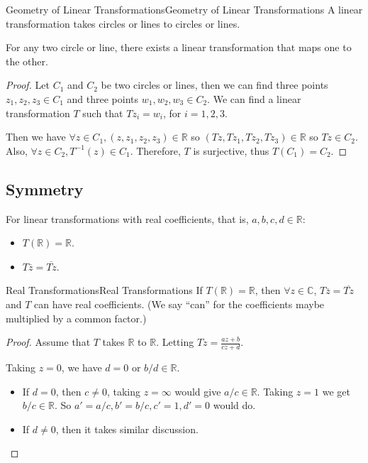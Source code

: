 \documentclass[../main.tex]{subfiles}
\begin{document}
\begin{corollary}{Geometry of Linear Transformations}{Geometry of Linear Transformations}
A linear transformation takes circles or lines to circles or lines.

For any two circle or line, there exists a linear transformation that maps one to the other.
\end{corollary}
\begin{proof}
Let $C_1$ and $C_2$ be two circles or lines, then we can find three points $z_1,z_2,z_3\in C_1$ and three points $w_1,w_2,w_3\in C_2$. We can find a linear transformation $T$ such that $Tz_i = w_i$, for $i=1,2,3$. 

Then we have $\forall z\in C_1, (z,z_1,z_2,z_3)\in \mathbb{R}$ so $(Tz,Tz_1,Tz_2,Tz_3)\in \mathbb{R}$ so $Tz\in C_2$. Also, $\forall z\in C_2, T^{-1}(z)\in C_1$. Therefore, $T$ is surjective, thus $T(C_1) = C_2$.
\end{proof}

\subsection{Symmetry}
For linear transformations with real coefficients, that is, $a,b,c,d\in\mathbb{R}$:
\begin{itemize}
\item $T(\mathbb{R}) = \mathbb{R}$.
\item $T \overline{z} = \overline{Tz}$.
\end{itemize}

\begin{proposition}{Real Transformations}{Real Transformations}
If $T(\mathbb{R})=\mathbb{R}$, then $\forall z\in \mathbb{C}$, $T \overline{z} = \overline{Tz}$ and $T$ can have real coefficients. (We say ``can'' for the coefficients maybe multiplied by a common factor.)
\end{proposition}
\begin{proof}
Assume that $T$ takes $\mathbb{R}$ to $\mathbb{R}$. Letting $\displaystyle Tz = \frac{az+b}{cz+d}$.

Taking $z=0$, we have $d=0$ or $b / d\in \mathbb{R}$.
\begin{itemize}
\item If $d=0$, then $c\neq 0$, taking $z= \infty $ would give $a / c\in \mathbb{R}$. Taking $z=1$ we get $b / c\in \mathbb{R}$. So $a' = a / c, b' = b / c, c'=1,d'=0$ would do.
\item If $d\neq 0$, then it takes similar discussion.
\end{itemize}
\end{proof}
\end{document}
